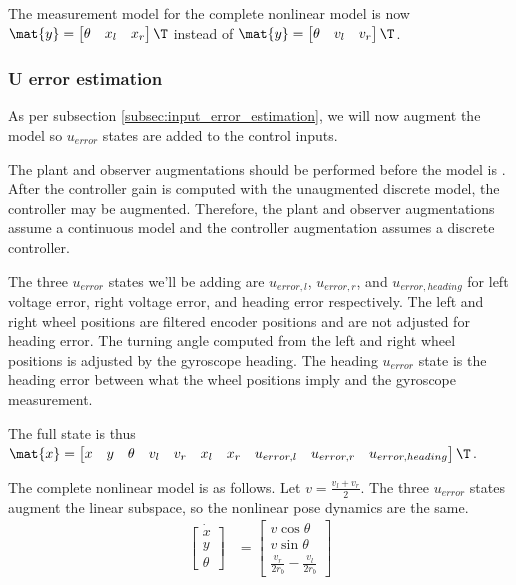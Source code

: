 The measurement model for the complete nonlinear model is now
$\mat{y} = \begin{bmatrix}\theta & x_l & x_r\end{bmatrix}\T$ instead of
$\mat{y} = \begin{bmatrix}\theta & v_l & v_r\end{bmatrix}\T$.

\subsubsection{U error estimation}

As per subsection \ref{subsec:input_error_estimation}, we will now augment the
\gls{model} so $u_{error}$ states are added to the \glspl{control input}.

The \gls{plant} and \gls{observer} augmentations should be performed before the
\gls{model} is . After the \gls{controller}
gain is computed with the unaugmented discrete \gls{model}, the controller may
be augmented. Therefore, the \gls{plant} and \gls{observer} augmentations assume
a continuous \gls{model} and the \gls{controller} augmentation assumes a
discrete \gls{controller}.

The three $u_{error}$ states we'll be adding are $u_{error,l}$, $u_{error,r}$,
and $u_{error,heading}$ for left voltage error, right voltage error, and heading
error respectively. The left and right wheel positions are filtered encoder
positions and are not adjusted for heading error. The turning angle computed
from the left and right wheel positions is adjusted by the gyroscope heading.
The heading $u_{error}$ state is the heading error between what the wheel
positions imply and the gyroscope measurement.

The full state is thus
$\mat{x} = \begin{bmatrix}x & y & \theta & v_l & v_r & x_l & x_r & u_{error,l} &
  u_{error,r} & u_{error,heading}\end{bmatrix}\T$.

The complete nonlinear model is as follows. Let $v = \frac{v_l + v_r}{2}$. The
three $u_{error}$ states augment the linear subspace, so the nonlinear pose
dynamics are the same.
\begin{align}
  \dot{\begin{bmatrix}
    x \\
    y \\
    \theta
  \end{bmatrix}} &=
    \begin{bmatrix}
      v\cos\theta \\
      v\sin\theta \\
      \frac{v_r}{2r_b} - \frac{v_l}{2r_b}
    \end{bmatrix}
\end{align}

